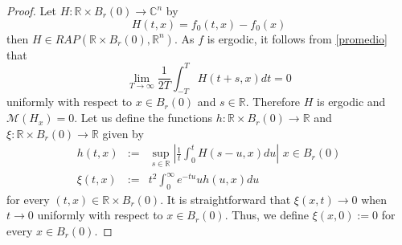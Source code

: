 \documentclass[10pt,a4paper]{amsart}
\newcommand{\bb}[1]{{\mathbb{#1}}}
\begin{document}
\begin{proof}
Let $H:\bb{R}\times B_{r}(0)\rightarrow \bb{C}^n$ by
$$H(t,x)=f_0 (t,x)-f_0 (x)$$
then $H\in RAP(\bb{R}\times B_{r}(0),\bb{R}^n)$. As $f$ is ergodic, it follows from \eqref{promedio} that
$$\lim_{T\rightarrow \infty}\frac{1}{2T}\int_{-T}^{T} H(t+s,x)dt =0$$
uniformly with respect to $x\in B_{r}(0)$ and $s\in \bb{R}$. Therefore $H$ is ergodic and $\mathcal{M}(H_x)=0$. 
Let us define the functions $h:\bb{R}\times B_{r}(0)\rightarrow \mathbb{R}$ and $\xi:\bb{R}\times B_{r}(0)\rightarrow \mathbb{R}$ given by
\begin{eqnarray*}
h(t,x)&:=&\sup_{s\in\bb{R}}\left\vert \frac{1}{t}\int_{0}^{t}H(s-u,x)du\right\vert \,\, x\in B_{r}(0)\\
\xi(t,x)&:=&t^2\int_{0}^{\infty} e^{-tu}u h(u,x)du
\end{eqnarray*}
for every $(t,x)\in\bb{R}\times B_{r}(0)$. It is straightforward that $\xi(x,t)\rightarrow 0$ when $t\rightarrow 0$ uniformly with respect to $x\in B_{r}(0)$. Thus, we define $\xi(x,0):=0$ for every $x\in B_{r}(0)$.


\end{proof}
\end{document}
